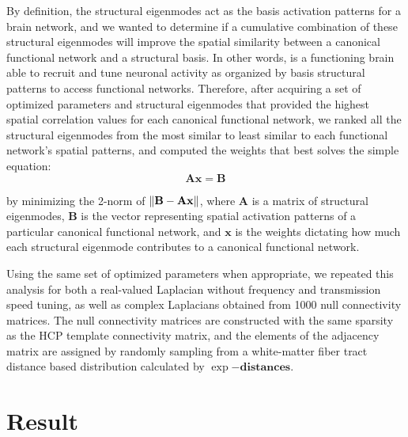 \documentclass{article}
\begin{document}
By definition, the structural eigenmodes act as the basis activation patterns for a brain network, and we wanted to determine if a cumulative combination of these structural eigenmodes will improve the spatial similarity between a canonical functional network and a structural basis. In other words, is a functioning brain able to recruit and tune neuronal activity as organized by basis structural patterns to access functional networks. Therefore, after acquiring a set of optimized parameters and structural eigenmodes that provided the highest spatial correlation values for each canonical functional network, we ranked all the structural eigenmodes from the most similar to least similar to each functional network's spatial patterns, and computed the weights that best solves the simple equation:
\begin{equation}
    \mathbf{Ax = B}
\end{equation}

by minimizing the 2-norm of $\mathbf{\norm{B-Ax}}$, where $\mathbf{A}$ is a matrix of structural eigenmodes, $\mathbf{B}$ is the vector representing spatial activation patterns of a particular canonical functional network, and $\mathbf{x}$ is the weights dictating how much each structural eigenmode contributes to a canonical functional network. 

Using the same set of optimized parameters when appropriate, we repeated this analysis for both a real-valued Laplacian without frequency and transmission speed tuning, as well as complex Laplacians obtained from 1000 null connectivity matrices. The null connectivity matrices are constructed with the same sparsity as the HCP template connectivity matrix, and the elements of the adjacency matrix are assigned by randomly sampling from a white-matter fiber tract distance based distribution calculated by $\exp{-\mathbf{distances}}$. 

\section{Result}
\end{document}
